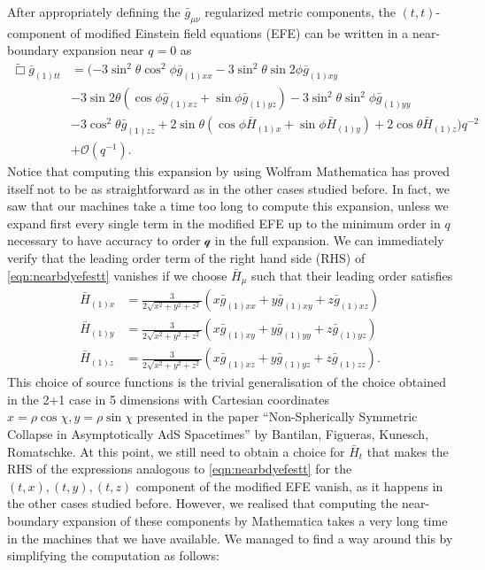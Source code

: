 \documentclass[12pt]{article}
\begin{document}
After appropriately defining the $\bar{g}_{\mu\nu}$ regularized metric components, the $(t,t)$- component of modified Einstein field equations (EFE) can be written in a near-boundary expansion near $q=0$ as
\begin{equation}
\label{eqn:nearbdyefestt}
\begin{split}
\tilde{\Box}\bar{g}_{(1)tt}&=(-3\sin^2\theta\cos^2\phi\bar{g}_{(1)xx}-3\sin^2\theta\sin2\phi\bar{g}_{(1)xy}\\
&-3\sin2\theta(\cos\phi\bar{g}_{(1)xz}+\sin\phi\bar{g}_{(1)yz})-3\sin^2\theta\sin^2\phi\bar{g}_{(1)yy}\\
&-3\cos^2\theta\bar{g}_{(1)zz}+2\sin\theta(\cos\phi\bar{H}_{(1)x}+\sin\phi\bar{H}_{(1)y})+2\cos\theta\bar{H}_{(1)z})q^{-2}\\
&+\mathcal{O}(q^{-1}).
\end{split}
\end{equation}
Notice that computing this expansion by using Wolfram Mathematica has proved itself not to be as straightforward as in the other cases studied before. In fact, we saw that our machines take a time too long to compute this expansion, unless we expand first every single term in the modified EFE up to the minimum order in $q$ necessary to have accuracy to order $\mathcal{q}$ in the full expansion.
We can immediately verify that the leading order term of the right hand side (RHS) of \eqref{eqn:nearbdyefestt} vanishes if we choose $\bar{H}_\mu$ such that their leading order satisfies
\begin{align}
\label{eq:hbx}
\bar{H}_{(1)x}&=\frac{3}{2\sqrt{x^2+y^2+z^2}}(x \bar{g}_{(1)xx}+y\bar{g}_{(1)xy}+z\bar{g}_{(1)xz})\\
\label{eq:hby}
\bar{H}_{(1)y}&=\frac{3}{2\sqrt{x^2+y^2+z^2}}(x \bar{g}_{(1)xy}+y\bar{g}_{(1)yy}+z\bar{g}_{(1)yz})\\
\label{eq:hbz}
\bar{H}_{(1)z}&=\frac{3}{2\sqrt{x^2+y^2+z^2}}(x \bar{g}_{(1)xz}+y\bar{g}_{(1)yz}+z\bar{g}_{(1)zz}).
\end{align}
This choice of source functions is the trivial generalisation of the choice obtained in the 2+1 case in 5 dimensions with Cartesian coordinates $x=\rho\cos\chi,y=\rho\sin\chi$ presented in the paper ``Non-Spherically Symmetric Collapse in Asymptotically AdS Spacetimes'' by Bantilan, Figueras, Kunesch, Romatschke.
At this point, we still need to obtain a choice for $\bar{H}_t$ that makes the RHS of the expressions analogous to \eqref{eqn:nearbdyefestt} for the $(t,x),(t,y),(t,z)$ component of the modified EFE vanish, as it happens in the other cases studied before. However, we realised that computing the near-boundary expansion of these components by Mathematica takes a very long time in the machines that we have available. We managed to find a way around this by simplifying the computation as follows:
\end{document}
